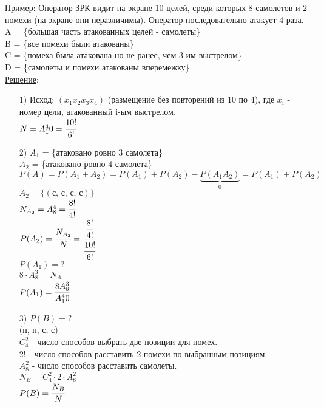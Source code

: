 \underline{Пример}: Оператор ЗРК видит на экране 10 целей, среди которых 8 самолетов и 2 помехи (на экране они неразличимы). Оператор последовательно атакует 4 раза. \\
A = \{большая часть атакованных целей - самолеты\} \\
B = \{все помехи были атакованы\} \\
C = \{помеха была атакована но не ранее, чем 3-им выстрелом\} \\
D = \{самолеты и помехи атакованы вперемежку\} \\
\underline{Решение}: \\
\begin{enumerate}
\item[1)] Исход: $(x_1 x_2 x_3 x_4)$ (размещение без повторений из 10 по 4), где $x_i$ - номер цели, атакованный i-ым выстрелом. \\
$N = A^4_10 = \cfrac{10!}{6!}$ \\

\item[2)] $A_1$ = \{атаковано ровно 3 самолета\} \\
$A_2$ = \{атаковано ровно 4 самолета\}
$P(A) = P(A_1 + A_2) = P(A_1) + P(A_2) - \underbrace{P(A_1 A_2)}_{\text{0}} = P(A_1) + P(A_2)$ \\
$A_2 = \{ (\text{с, с, с, с})\}$ \\
$N_{A_2} = A^4_8 = \cfrac{8!}{4!}$ \\
$P(A_2) = \cfrac{N_{A_2}}{N} = \cfrac{\cfrac{8!}{4!}}{\cfrac{10!}{6!}}$ \\
$P(A_1) = ?$ \\
$8 \cdot A^3_8 = N_{A_1}$ \\
$P(A_1) = \cfrac{8 A^3_8}{A^4_10}$ \\

\item[3)] $P(B) = ?$ \\
(п, п, с, с) \\
$C^2_4$ - число способов выбрать две позиции для помех.\\
$2!$ - число способов расставить 2 помехи по выбранным позициям. \\
$A^2_8$ - число способов расставить самолеты. \\
$N_B = C^2_4 \cdot 2 \cdot A^2_8$ \\
$P(B) = \cfrac{N_B}{N}$ \\


\end{enumerate}
